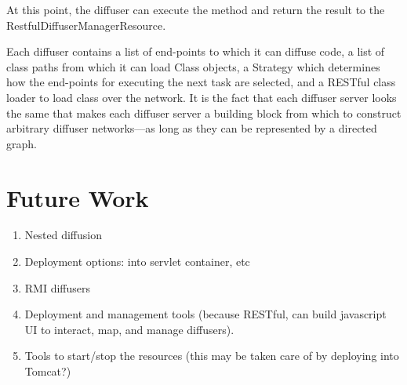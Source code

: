 \documentclass[11pt]{article}
\begin{document}
At this point, the diffuser can execute the method and return the result to the \textsf{Restful\-Diffuser\-Manager\-Resource}.

Each diffuser contains a list of end-points to which it can diffuse code, a list of class paths from which it can load \textsf{Class} objects, a \textsf{Strategy} which determines how the end-points for executing the next task are selected, and a RESTful class loader to load class over the network. It is the fact that each diffuser server looks the same that makes each diffuser server a building block from which to construct arbitrary diffuser networks---as long as they can be represented by a directed graph.

%
%
\section{Future Work}
\begin{enumerate}
\item Nested diffusion
\item Deployment options: into servlet container, etc
\item RMI diffusers
\item Deployment and management tools (because RESTful, can build javascript UI to interact, map, and manage diffusers).
\item Tools to start/stop the resources (this may be taken care of by deploying into Tomcat?)
\end{enumerate}
\end{document}
